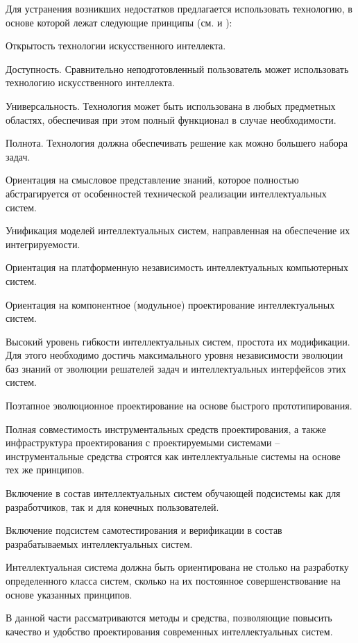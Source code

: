 \begin{partbacktext}
Для устранения возникших недостатков предлагается использовать технологию, в основе которой лежат следующие принципы (см.  и ):
\begin{textitemize}
	\item{Открытость технологии искусственного интеллекта.}
	\item{Доступность. Сравнительно неподготовленный пользователь может использовать технологию искусственного интеллекта.}
	\item{Универсальность. Технология может быть использована в любых предметных областях, обеспечивая при этом полный функционал в случае необходимости.}
	\item{Полнота. Технология должна обеспечивать решение как можно большего набора задач.}
	\item{Ориентация на смысловое представление знаний, которое полностью абстрагируется от
		особенностей технической реализации интеллектуальных систем.}
	\item{Унификация моделей интеллектуальных систем, направленная на обеспечение их интегрируемости.}
	\item{Ориентация на платформенную независимость интеллектуальных компьютерных систем.}
	\item{Ориентация на компонентное (модульное) проектирование интеллектуальных систем.}
	\item{Высокий уровень гибкости интеллектуальных систем, простота их модификации. Для этого необходимо достичь максимального уровня независимости эволюции баз знаний от эволюции решателей задач и интеллектуальных интерфейсов этих систем.}
	\item{Поэтапное эволюционное проектирование на основе быстрого прототипирования.}
	\item{Полная совместимость инструментальных средств проектирования, а также инфраструктура проектирования с проектируемыми системами – инструментальные средства строятся как интеллектуальные системы на основе тех же принципов.}
	\item{Включение в состав интеллектуальных систем обучающей подсистемы как для разработчиков, так и для конечных пользователей.}
	\item{Включение подсистем самотестирования и верификации в состав разрабатываемых интеллектуальных систем.}
\end{textitemize}

Интеллектуальная система должна быть ориентирована не столько на разработку определенного класса систем, сколько на их постоянное совершенствование  на основе указанных принципов.

В данной части рассматриваются методы и средства, позволяющие повысить качество и удобство проектирования современных интеллектуальных систем.
\end{partbacktext}




